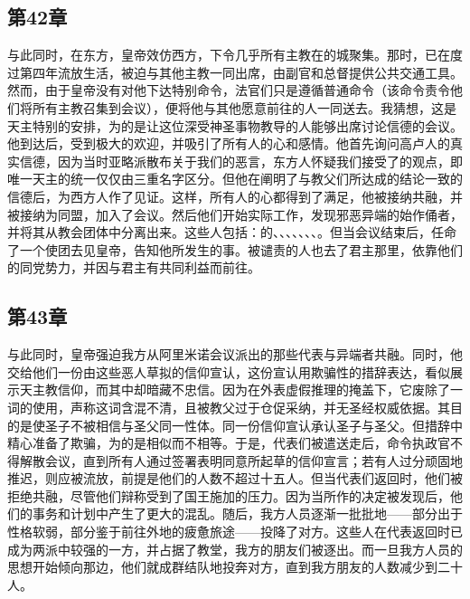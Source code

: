 
\subsection{第42章}

与此同时，在东方，皇帝效仿西方，下令几乎所有主教在的城聚集。那时，已在度过第四年流放生活，被迫与其他主教一同出席，由副官和总督提供公共交通工具。然而，由于皇帝没有对他下达特别命令，法官们只是遵循普通命令（该命令责令他们将所有主教召集到会议），便将他与其他愿意前往的人一同送去。我猜想，这是天主特别的安排，为的是让这位深受神圣事物教导的人能够出席讨论信德的会议。他到达后，受到极大的欢迎，并吸引了所有人的心和感情。他首先询问高卢人的真实信德，因为当时亚略派散布关于我们的恶言，东方人怀疑我们接受了的观点，即唯一天主的统一仅仅由三重名字区分。但他在阐明了与教父们所达成的结论一致的信德后，为西方人作了见证。这样，所有人的心都得到了满足，他被接纳共融，并被接纳为同盟，加入了会议。然后他们开始实际工作，发现邪恶异端的始作俑者，并将其从教会团体中分离出来。这些人包括：的、、、、、、、。但当会议结束后，任命了一个使团去见皇帝，告知他所发生的事。被谴责的人也去了君主那里，依靠他们的同党势力，并因与君主有共同利益而前往。\par


\subsection{第43章}

与此同时，皇帝强迫我方从阿里米诺会议派出的那些代表与异端者共融。同时，他交给他们一份由这些恶人草拟的信仰宣认，这份宣认用欺骗性的措辞表达，看似展示天主教信仰，而其中却暗藏不忠信。因为在外表虚假推理的掩盖下，它废除了一词的使用，声称这词含混不清，且被教父过于仓促采纳，并无圣经权威依据。其目的是使圣子不被相信与圣父同一性体。同一份信仰宣认承认圣子与圣父。但措辞中精心准备了欺骗，为的是相似而不相等。于是，代表们被遣送走后，命令执政官不得解散会议，直到所有人通过签署表明同意所起草的信仰宣言；若有人过分顽固地推迟，则应被流放，前提是他们的人数不超过十五人。但当代表们返回时，他们被拒绝共融，尽管他们辩称受到了国王施加的压力。因为当所作的决定被发现后，他们的事务和计划中产生了更大的混乱。随后，我方人员逐渐一批批地——部分出于性格软弱，部分鉴于前往外地的疲惫旅途——投降了对方。这些人在代表返回时已成为两派中较强的一方，并占据了教堂，我方的朋友们被逐出。而一旦我方人员的思想开始倾向那边，他们就成群结队地投奔对方，直到我方朋友的人数减少到二十人。\par

